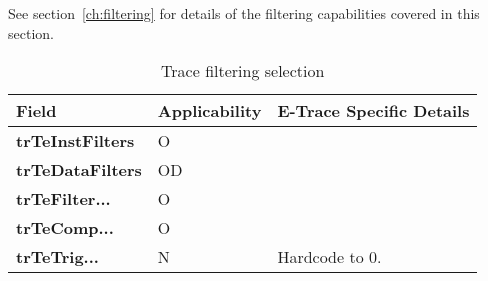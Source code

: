 See section~\ref{ch:filtering} for details of the filtering capabilities covered in this section.

\begin{table}[htp]
  \centering
  \caption{Trace filtering selection}
  \label{tab:ctl-filtersel}
  \begin{tabulary}{\textwidth}{|l|l|p{90mm}|}
    \hline
    {\bf Field} & {\bf Applicability} & {\bf E-Trace Specific Details} \\
    \hline
    \textbf{trTeInstFilters} & O & \\
    \hline
    \textbf{trTeDataFilters} & OD & \\
    \hline
    \textbf{trTeFilter...} & O & \\
    \hline
    \textbf{trTeComp...} & O & \\
    \hline
    \textbf{trTeTrig...} & N & Hardcode to 0.\\
    \hline
  \end{tabulary}
\end{table}
